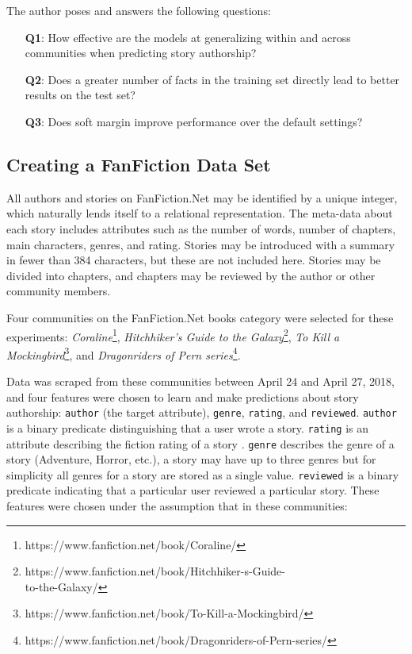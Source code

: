 \documentclass[letterpaper]{article}
\begin{document}
The author poses and answers the following questions:

\begin{enumerate}
    \item[\textbf{Q1}:] How effective are the models at generalizing within and across communities when predicting story authorship?
    \item[\textbf{Q2}:] Does a greater number of facts in the training set directly lead to better results on the test set?
    \item[\textbf{Q3}:] Does soft margin improve performance over the default settings?
\end{enumerate}

\subsection{Creating a FanFiction Data Set}

All authors and stories on FanFiction.Net may be identified by a unique integer, which naturally lends itself to a relational representation. The meta-data about each story includes attributes such as the number of words, number of chapters, main characters, genres, and rating. Stories may be introduced with a summary in fewer than 384 characters, but these are not included here. Stories may be divided into chapters, and chapters may be reviewed by the author or other community members.

Four communities on the FanFiction.Net books category were selected for these experiments: \textit{Coraline}\footnote{https://www.fanfiction.net/book/Coraline/}, \textit{Hitchhiker's Guide to the Galaxy}\footnote{https://www.fanfiction.net/book/Hitchhiker-s-Guide-\\to-the-Galaxy/}, \textit{To Kill a Mockingbird}\footnote{https://www.fanfiction.net/book/To-Kill-a-Mockingbird/}, and \textit{Dragonriders of Pern series}\footnote{https://www.fanfiction.net/book/Dragonriders-of-Pern-series/}.

Data was scraped from these communities between April 24 and April 27, 2018, and four features were chosen to learn and make predictions about story authorship: \texttt{author} (the target attribute), \texttt{genre}, \texttt{rating}, and \texttt{reviewed}. \texttt{author} is a binary predicate distinguishing that a user wrote a story. \texttt{rating} is an attribute describing the fiction rating of a story \cite{fictionratings}. \texttt{genre} describes the genre of a story (Adventure, Horror, etc.), a story may have up to three genres but for simplicity all genres for a story are stored as a single value. \texttt{reviewed} is a binary predicate indicating that a particular user reviewed a particular story.  These features were chosen under the assumption that in these communities:
\end{document}
